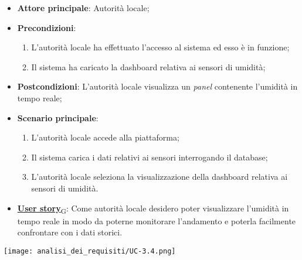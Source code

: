 \begin{itemize}
	\item \textbf{Attore principale}: Autorità locale;
	\item \textbf{Precondizioni}:
	      \begin{enumerate}
		      \item L'autorità locale ha effettuato l'accesso al sistema ed esso è in funzione;
		      \item Il sistema ha caricato la dashboard relativa ai sensori di umidità;
	      \end{enumerate}
	\item \textbf{Postcondizioni}: L'autorità locale visualizza un \textit{panel} contenente l'umidità in tempo reale;
	\item \textbf{Scenario principale}:
	      \begin{enumerate}
		      \item L'autorità locale accede alla piattaforma;
		      \item Il sistema carica i dati relativi ai sensori interrogando il database;
		      \item L'autorità locale seleziona la visualizzazione della dashboard relativa ai sensori di umidità.
	      \end{enumerate}
	\item \href{https://7last.github.io/docs/rtb/documentazione-interna/glossario\#user-story}{\textbf{User story}\textsubscript{G}}:
	      Come autorità locale desidero poter visualizzare l'umidità in tempo reale in modo da poterne monitorare l'andamento
	      e poterla facilmente confrontare con i dati storici.
\end{itemize}
\begin{center}
	\texttt{[image: analisi\_dei\_requisiti/UC-3.4.png]}
\end{center}

